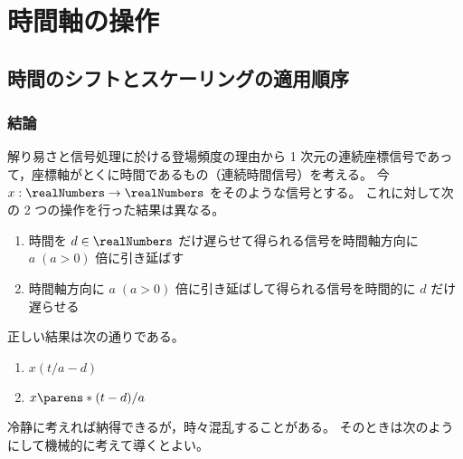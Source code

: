 \part{時間軸の操作}
    \chapter{時間のシフトとスケーリングの適用順序}
        \section{結論}
            \label{時間のシフトとスケーリングの適用順序.結論}
            解り易さと信号処理に於ける登場頻度の理由から 1 次元の連続座標信号であって，座標軸がとくに時間であるもの（連続時間信号）を考える。
            今 $x:\realNumbers\to\realNumbers$ をそのような信号とする。
            これに対して次の 2 つの操作を行った結果は異なる。
            \begin{enumerate}
                \item 時間を $d\in\realNumbers$ だけ遅らせて得られる信号を時間軸方向に $a\;(a>0)$ 倍に引き延ばす
                \item 時間軸方向に $a\;(a>0)$ 倍に引き延ばして得られる信号を時間的に $d$ だけ遅らせる
            \end{enumerate}
            正しい結果は次の通りである。
            \begin{enumerate}
                \item $x(t/a-d)$
                \item $x\parens*{(t-d)/a}$
            \end{enumerate}
            冷静に考えれば納得できるが，時々混乱することがある。
            そのときは次のようにして機械的に考えて導くとよい。
